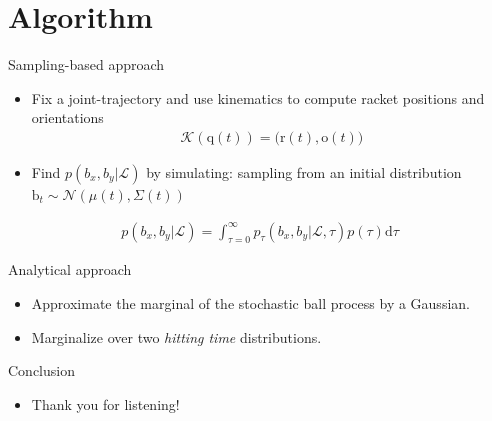 \documentclass[handout]{beamer}
\newcommand{\boldvec}[1]{\boldsymbol{\mathrm{#1}}}
\let\vec\boldvec
\newcommand{\kin}{\mathcal{K}} %
\newcommand{\joint}{\vec{q}} %
\newcommand{\ball}{\vec{b}} %
\newcommand{\racket}{\vec{r}} %
\newcommand{\orient}{\vec{o}} %
\newcommand{\landTime}{\tau} %
\newcommand{\landEvent}{\mathcal{L}} %
\newcommand{\landDist}{p(\tau)} %
\begin{document}
\section{Algorithm}
%
\begin{frame}{Sampling-based approach}
\begin{itemize}
\item Fix a joint-trajectory and use kinematics to compute racket positions and orientations
%
\begin{align}
\kin(\joint(t)) = \big(\racket(t), \orient(t)\big)
\end{align}
%
\item Find $p(b_x,b_y|\landEvent)$ by simulating: sampling from an initial distribution $\ball_t \sim \mathcal{N}(\mu(t),\Sigma(t))$
\end{itemize}
\begin{align}
p(b_x,b_y|\landEvent) = \int_{\landTime = 0}^{\infty} p_{\landTime}(b_x,b_y|\landEvent,\landTime)\landDist \textrm{d}\landTime
\label{marginalProcess} 
\end{align}
\end{frame}
%
\begin{frame}{Analytical approach}
\begin{itemize}
\item Approximate the marginal of the stochastic ball process by a Gaussian.
\item Marginalize over two \emph{hitting time} distributions.
\end{itemize}
\end{frame}
%
\begin{frame}{Conclusion}
\begin{itemize}
\item Thank you for listening!
\end{itemize}
\end{frame}	
%
%
%

%
\end{document}
